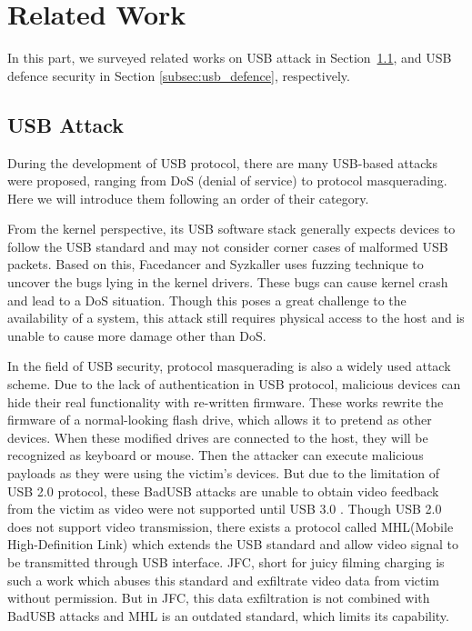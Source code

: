 \section{Related Work}
\label{sec:related_work}

In this part, we surveyed related works on USB attack in Section~\ref{subsec:usb_attack}, and USB defence security in Section \ref{subsec:usb_defence}, respectively.

\subsection{USB Attack}
\label{subsec:usb_attack}
During the development of USB protocol, there are many USB-based attacks were proposed, ranging from DoS (denial of service) to protocol masquerading. Here we will introduce them following an order of their category.

From the kernel perspective, its USB software stack generally expects devices to follow the USB standard and may not consider corner cases of malformed USB packets. Based on this, Facedancer\cite{facedancer} and Syzkaller\cite{syzkaller} uses fuzzing technique to uncover the bugs lying in the kernel drivers. These bugs can cause kernel crash and lead to a DoS situation. Though this poses a great challenge to the availability of a system, this attack still requires physical access to the host and is unable to cause more damage other than DoS.

In the field of USB security, protocol masquerading is also a widely used attack scheme. Due to the lack of authentication in USB protocol, malicious devices can hide their real functionality with re-written firmware\cite{rubber,badusb, rubberducky2020, usbbypassing, iseeyou, usbdriver}. These works rewrite the firmware of a normal-looking flash drive, which allows it to pretend as other devices. When these modified drives are connected to the host, they will be recognized as keyboard or mouse. Then the attacker can execute malicious payloads as they were using the victim's devices. But due to the limitation of USB 2.0\cite{usb20} protocol, these BadUSB attacks are unable to obtain video feedback from the victim as video were not supported until USB 3.0 \cite{usb30}. Though USB 2.0 does not support video transmission, there exists a protocol called MHL(Mobile High-Definition Link) which extends the USB standard and allow video signal to be transmitted through USB interface. JFC\cite{JFC}, short for juicy filming charging is such a work which abuses this standard and exfiltrate video data from victim without permission. But in JFC, this data exfiltration is not combined with BadUSB attacks and MHL is an outdated standard, which limits its capability.

